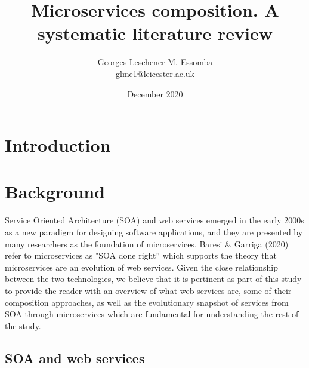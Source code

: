 \documentclass{article}
\begin{document}
\author{Georges Leschener M. Essomba \\ \href{mailto:glme1@leicester.ac.uk}{glme1@leicester.ac.uk} }
\title{Microservices composition. A systematic literature review}
\date{December 2020} %

\maketitle{} %

\pagebreak %
\tableofcontents %
\pagebreak %

\renewcommand*\abstractname{\flushleft\textbf{Abstract}\hfill}
\begin{abstract}

\noindent 


\end{abstract}


\section{Introduction}

\section{Background}
Service Oriented Architecture (SOA) and web services emerged in the early 2000s as a new paradigm for designing software applications, and they are presented by many researchers as the foundation of microservices. Baresi \& Garriga (2020) refer to microservices as "SOA done right” which supports the theory that microservices are an evolution of web services. Given the close relationship between the two technologies, we believe that it is pertinent as part of this study to provide the reader with an overview of what web services are, some of their composition approaches, as well as the evolutionary snapshot of services from SOA through microservices which are fundamental for understanding the rest of the study.

\subsection{SOA and web services}
\end{document}
